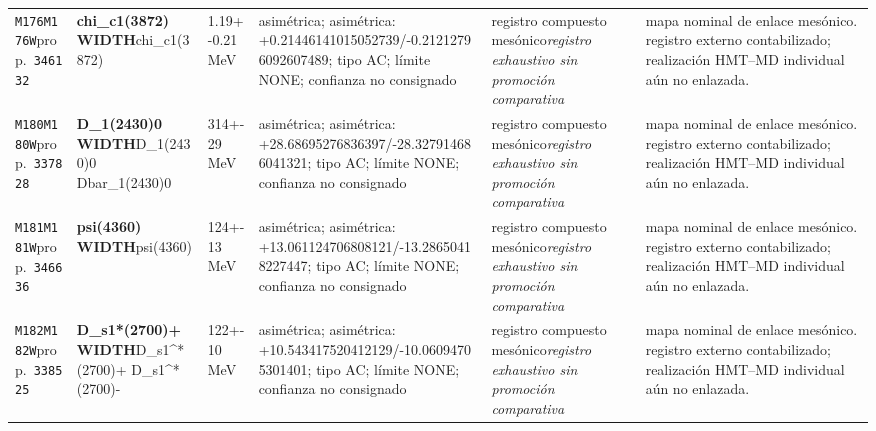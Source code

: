 \begin{landscape}
\begin{longtable}{L{1.85cm}L{4.45cm}L{2.35cm}L{4.05cm}L{3.35cm}L{7.15cm}}
\texttt{M176}\newline \texttt{M176W}\newline prop.\ \texttt{346132} & \textbf{chi\_\allowbreak{}c1(3872) WIDTH}\newline chi\_\allowbreak{}c1(3872) & 1.19+-0.21\,MeV & asimétrica; asimétrica: +0.21446141015052739/-0.21212796092607489; tipo AC; límite NONE; confianza no consignado & registro compuesto mesónico\newline \emph{registro exhaustivo sin promoción comparativa} & mapa nominal de enlace mesónico. registro externo contabilizado; realización HMT--MD individual aún no enlazada. \\
\texttt{M180}\newline \texttt{M180W}\newline prop.\ \texttt{337828} & \textbf{D\_\allowbreak{}1(2430)0 WIDTH}\newline D\_\allowbreak{}1(2430)0 \textbar{}\allowbreak{} Dbar\_\allowbreak{}1(2430)0 & 314+-29\,MeV & asimétrica; asimétrica: +28.68695276836397/-28.327914686041321; tipo AC; límite NONE; confianza no consignado & registro compuesto mesónico\newline \emph{registro exhaustivo sin promoción comparativa} & mapa nominal de enlace mesónico. registro externo contabilizado; realización HMT--MD individual aún no enlazada. \\
\texttt{M181}\newline \texttt{M181W}\newline prop.\ \texttt{346636} & \textbf{psi(4360) WIDTH}\newline psi(4360) & 124+-13\,MeV & asimétrica; asimétrica: +13.061124706808121/-13.28650418227447; tipo AC; límite NONE; confianza no consignado & registro compuesto mesónico\newline \emph{registro exhaustivo sin promoción comparativa} & mapa nominal de enlace mesónico. registro externo contabilizado; realización HMT--MD individual aún no enlazada. \\
\texttt{M182}\newline \texttt{M182W}\newline prop.\ \texttt{338525} & \textbf{D\_\allowbreak{}s1*(2700)+ WIDTH}\newline D\_\allowbreak{}s1\textasciicircum{}*(2700)+ \textbar{}\allowbreak{} D\_\allowbreak{}s1\textasciicircum{}*(2700)- & 122+-10\,MeV & asimétrica; asimétrica: +10.543417520412129/-10.06094705301401; tipo AC; límite NONE; confianza no consignado & registro compuesto mesónico\newline \emph{registro exhaustivo sin promoción comparativa} & mapa nominal de enlace mesónico. registro externo contabilizado; realización HMT--MD individual aún no enlazada. \\

\end{longtable}
\end{landscape}
